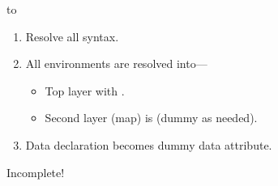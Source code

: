 \documentclass[pdftex,aspectratio=169,14pt]{beamer}
\begin{document}
\begin{frame}{\CRSX to \hax}
  \begin{enumerate}

  \item Resolve all syntax.

  \item All environments are resolved into---
    \begin{itemize}
    \item Top layer with .
    \item Second layer (map) is   (dummy as needed).
    \end{itemize}

  \item Data declaration becomes dummy data attribute.

  \end{enumerate}
  \alert{Incomplete!}
\end{frame}
\end{document}
